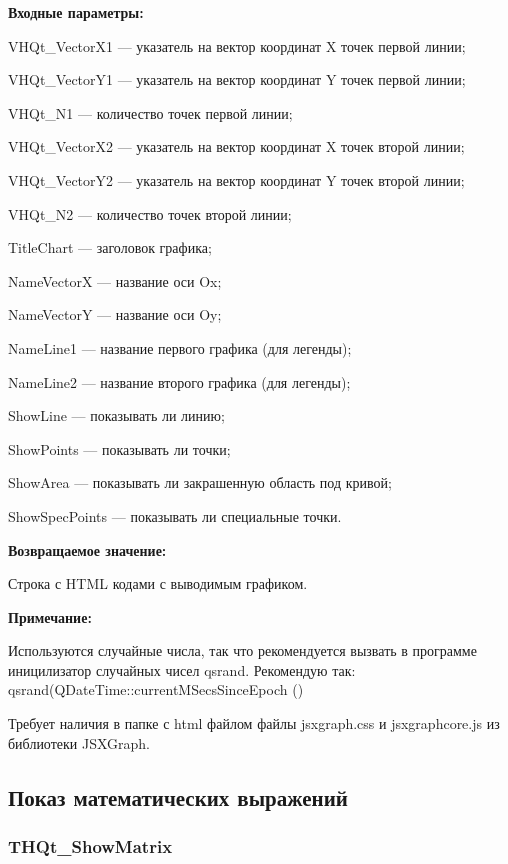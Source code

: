 \documentclass[a4paper,12pt]{article}
\begin{document}
\textbf{Входные параметры:}
 
    VHQt\_VectorX1 --- указатель на вектор координат X точек первой линии;
 
    VHQt\_VectorY1 --- указатель на вектор координат Y точек первой линии;
 
    VHQt\_N1 --- количество точек первой линии;
 
    VHQt\_VectorX2 --- указатель на вектор координат X точек второй линии;
 
    VHQt\_VectorY2 --- указатель на вектор координат Y точек второй линии;
 
    VHQt\_N2 --- количество точек второй линии;
 
    TitleChart --- заголовок графика;
 
    NameVectorX --- название оси Ox;
 
    NameVectorY --- название оси Oy;
 
    NameLine1 --- название первого графика (для легенды);
 
    NameLine2 --- название второго графика (для легенды);
 
    ShowLine --- показывать ли линию;
 
    ShowPoints --- показывать ли точки;
 
    ShowArea --- показывать ли закрашенную область под кривой;
 
    ShowSpecPoints --- показывать ли специальные точки.

\textbf{Возвращаемое значение:}

Строка с HTML кодами с выводимым графиком.

\textbf{Примечание:}

Используются случайные числа, так что рекомендуется вызвать в программе иницилизатор случайных чисел qsrand. Рекомендую так: qsrand(QDateTime::currentMSecsSinceEpoch () %

Требует наличия в папке с html файлом файлы jsxgraph.css и jsxgraphcore.js из библиотеки JSXGraph.


\subsection{Показ математических выражений}

\subsubsection{THQt\_ShowMatrix}\label{THQt_ShowMatrix}
\end{document}
